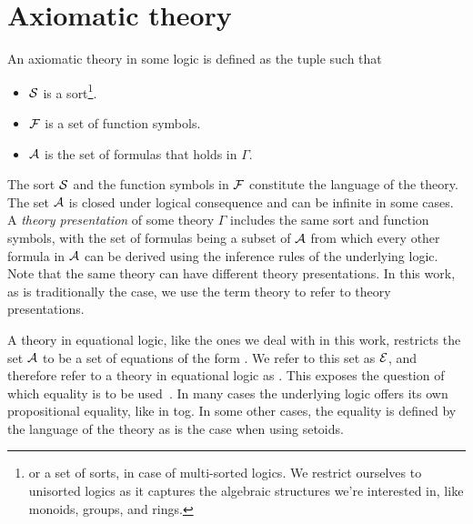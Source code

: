 \section{Axiomatic theory}
\label{sec:background:theory}
An axiomatic theory  in some logic is defined as the tuple \lstmath{($\sort$,$\fsyms$,$\axioms$)} such that 
\begin{itemize}
\item $\sort$ is a sort\footnote{or a set of sorts, in case of multi-sorted logics. We restrict ourselves to unisorted logics as it captures the algebraic structures we're interested in, like monoids, groups, and rings.}.
\item $\fsyms$ is a set of function symbols. 
\item $\axioms$ is the set of formulas that holds in $\Gamma$. 
\end{itemize}
The sort $\sort$ and the function symbols in $\fsyms$ constitute the language of the theory. 
The set $\axioms$ is closed under logical consequence and can be infinite in some cases. 
A \emph{theory presentation} of some theory $\Gamma$ includes the same sort and function symbols, with the set of formulas being a subset of $\axioms$ from which every other formula in $\axioms$ can be derived using the inference rules of the underlying logic. 
Note that the same theory can have different theory presentations. 
In this work, as is traditionally the case, we use the term theory to refer to theory presentations. 

A theory in equational logic, like the ones we deal with in this work, restricts the set $\axioms$ to be a set of equations of the form . We refer to this set as $\equations$, and therefore refer to a theory in equational logic as \lstmath{($\sort$,$\fsyms$,$\equations$)}. 
This exposes the question of which equality is to  be used~\cite{oneThingSame2008, equalityInTPs2015}. In many cases the underlying logic offers its own propositional equality, like in tog. In some other cases, the equality is defined by the language of the theory as is the case when using setoids. 



